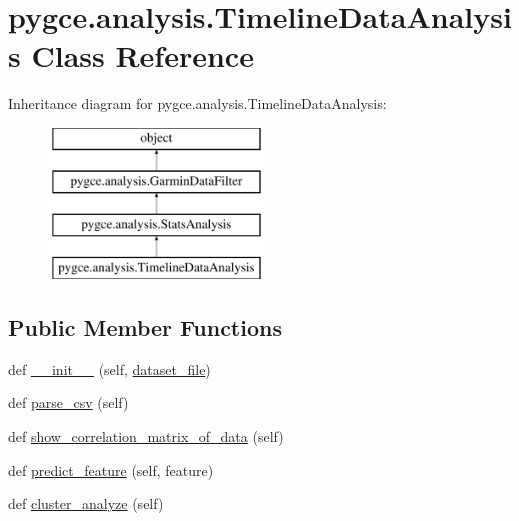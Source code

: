 \hypertarget{classpygce_1_1analysis_1_1_timeline_data_analysis}{}\section{pygce.\+analysis.\+Timeline\+Data\+Analysis Class Reference}
\label{classpygce_1_1analysis_1_1_timeline_data_analysis}
Inheritance diagram for pygce.\+analysis.\+Timeline\+Data\+Analysis\+:\begin{figure}[H]
\begin{center}
\leavevmode
\includegraphics[height=4.000000cm]{classpygce_1_1analysis_1_1_timeline_data_analysis}
\end{center}
\end{figure}
\subsection*{Public Member Functions}
\begin{DoxyCompactItemize}
\item 
def \hyperlink{classpygce_1_1analysis_1_1_timeline_data_analysis_a9e91bf53bd4b8d296ea000eb8987b6b5}{\+\_\+\+\_\+init\+\_\+\+\_\+} (self, \hyperlink{classpygce_1_1analysis_1_1_garmin_data_filter_a1d609bdd447d36bafce41e43586540ef}{dataset\+\_\+file})
\item 
def \hyperlink{classpygce_1_1analysis_1_1_timeline_data_analysis_ad18b5e408dc9f7398f15a402f724c0e6}{parse\+\_\+csv} (self)
\item 
def \hyperlink{classpygce_1_1analysis_1_1_timeline_data_analysis_a43a922561cd8135bd07b14c4af82c79d}{show\+\_\+correlation\+\_\+matrix\+\_\+of\+\_\+data} (self)
\item 
def \hyperlink{classpygce_1_1analysis_1_1_timeline_data_analysis_ac0a21d9f32730457a5198b88cdba6f0f}{predict\+\_\+feature} (self, feature)
\item 
def \hyperlink{classpygce_1_1analysis_1_1_timeline_data_analysis_a63508fda18919e49051fa70909e86b52}{cluster\+\_\+analyze} (self)
\end{DoxyCompactItemize}
